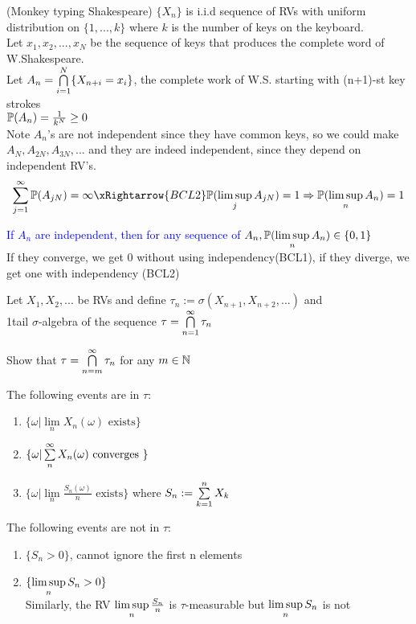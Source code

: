 \newpage
\begin{example}(Monkey typing Shakespeare) $\{X_n\}$ is i.i.d sequence of RVs with uniform distribution on $\{1,...,k\}$ where $k$ is the number of keys on the keyboard. \\
Let $x_1, x_2, ..., x_N$ be the sequence of keys that produces the complete word of W.Shakespeare. \\
Let $A_n = \bigcap\limits_{i=1}^N \{X_{n+i} = x_i\}$, the complete work of W.S. starting with (n+1)-st key strokes \\
$\mathbb{P}(A_n) = \frac{1}{k^N} \geq 0$ \\
Note $A_n$'s are not independent since they have common keys, so we could make $A_N, A_{2N}, A_{3N}, ...$ and they are indeed independent, since they depend on independent RV's.
\begin{equation*}
    \bigs{j=1}^\infty \prob(A_{jN}) = \infty \xRightarrow{BCL2} \prob(\lsup{j}A_{jN}) =1 \Rightarrow \prob(\lsup{n}A_n) = 1
\end{equation*}
\end{example}
\textcolor{blue}{If $A_n$ are independent, then for any sequence of $A_n, \mathbb{P}(\limsup\limits_{n}A_n) \in \{0,1\}$}\\
\pf If they converge, we get 0 without using independency(BCL1), if they diverge, we get one with independency (BCL2)
\begin{dfn}
Let $X_1, X_2,...$ be RVs and define $\tau_n := \sigma(X_{n+1},X_{n+2}, ...)$ and \\
1tail $\sigma$-algebra of the sequence $\tau = \bigcap\limits_{n=1}^\infty \tau_n$
\end{dfn}
\begin{ex}
Show that $\tau = \bigcap\limits_{n=m}^\infty \tau_n$ for any $m\in\mathbb{N}$
\end{ex}
\begin{ex}
The following events are in $\tau$:
\begin{enumerate}
    \item $\{\omega| \lim\limits_{n} X_n(\omega) \text{ exists} \}$
    \item $\{\omega| \sum\limits_{n}^\infty X_n(\omega) \text{ converges } \}$
    \item $\{\omega| \lim\limits_{n} \frac{S_n(\omega)}{n} \text{ exists} \}$ where $S_n := \sum\limits_{k=1}^n X_k$
\end{enumerate}
The following events are not in $\tau$:
\begin{enumerate}
    \item $\{S_n >0\}$, cannot ignore the first n elements
    \item $\{\limsup\limits_{n} S_n >0\}$ \\
    Similarly, the RV $\limsup\limits_{n} \frac{S_n}{n}$ is $\tau$-measurable but $\limsup\limits_{n} S_n$ is not 
\end{enumerate}
\end{ex}
